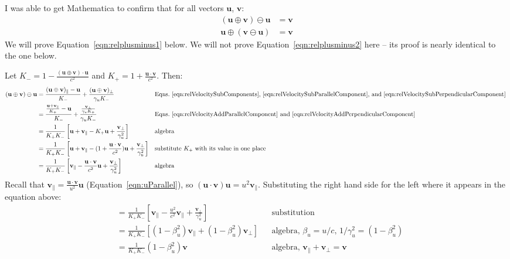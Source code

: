 \documentclass[a4paper]{article}
\theoremstyle{plain}
\theoremstyle{definition}
\newcommand{\vect}[1]{\mathbf{#1}}
\begin{document}
I was able to get Mathematica to confirm that
for all vectors $\vect{u}$, $\vect{v}$:
\begin{align}
(\vect{u} \oplus \vect{v}) \ominus \vect{u} & = \vect{v} \label{eqn:relplusminus1} \\
\vect{u} \oplus (\vect{v} \ominus \vect{u}) & = \vect{v} \label{eqn:relplusminus2}
\end{align}
We will prove Equation~\eqref{eqn:relplusminus1} below.
We will not prove Equation~\eqref{eqn:relplusminus2} here --
its proof is nearly identical to the one below.

Let $K_{-} = 1 - \frac{(\vect{u} \oplus \vect{v}) \cdot \vect{u}}{c^2}$
and $K_{+} = 1 + \frac{\vect{u} \cdot \vect{v}}{c^2}$.
Then:
\begin{align}
(\vect{u} \oplus \vect{v}) \ominus \vect{u}
  & = \frac{(\vect{u} \oplus \vect{v})_{\parallel} - \vect{u}}{K_{-}} + \frac{(\vect{u} \oplus \vect{v})_{\perp}}{\gamma_u K_{-}} & & \text{Eqns.~\eqref{eqn:relVelocitySubComponents},~\eqref{eqn:relVelocitySubParallelComponent}, and~\eqref{eqn:relVelocitySubPerpendicularComponent} } \nonumber \\
  & = \frac{\frac{\vect{u} + \vect{v}_{\parallel}}{K_{+}} - \vect{u}}{K_{-}} + \frac{\frac{\vect{v}_{\perp}}{\gamma_u K_{+}}}{\gamma_u K_{-}} & & \text{Eqns.~\eqref{eqn:relVelocityAddParallelComponent} and~\eqref{eqn:relVelocityAddPerpendicularComponent} } \nonumber \\
  & = \frac{1}{K_{+}K_{-}} \left[ \vect{u} + \vect{v}_{\parallel} - K_{+} \vect{u} + \frac{\vect{v}_{\perp}}{\gamma_u^2} \right] & & \text{algebra} \nonumber \\
  & = \frac{1}{K_{+}K_{-}} \left[ \vect{u} + \vect{v}_{\parallel} - (1 + \frac{\vect{u} \cdot \vect{v}}{c^2}) \vect{u} + \frac{\vect{v}_{\perp}}{\gamma_u^2} \right] & & \text{substitute $K_{+}$ with its value in one place} \nonumber \\
  & = \frac{1}{K_{+}K_{-}} \left[ \vect{v}_{\parallel} - \frac{\vect{u} \cdot \vect{v}}{c^2} \vect{u} + \frac{\vect{v}_{\perp}}{\gamma_u^2} \right] & & \text{algebra} \nonumber
\end{align}
Recall that
$\vect{v}_{\parallel} = \frac{\vect{u} \cdot \vect{v}}{u^2} \vect{u}$
(Equation~\eqref{eqn:uParallel}), so
$(\vect{u} \cdot \vect{v}) \vect{u} = u^2 \vect{v}_{\parallel}$.
Substituting the right hand side for the left where it appears
in the equation above:
\begin{align}
  & = \frac{1}{K_{+}K_{-}} \left[ \vect{v}_{\parallel} - \frac{u^2}{c^2} \vect{v}_{\parallel} + \frac{\vect{v}_{\perp}}{\gamma_u^2} \right] & & \text{substitution} \nonumber \\
  & = \frac{1}{K_{+}K_{-}} \left[ (1-\beta_u^2) \vect{v}_{\parallel} + (1-\beta_u^2)\vect{v}_{\perp} \right] & & \text{algebra, $\beta_u = u/c$, $1/\gamma_u^2 = (1-\beta_u^2)$} \nonumber \\
  & = \frac{1}{K_{+}K_{-}} (1-\beta_u^2) \vect{v} & & \text{algebra, $\vect{v}_{\parallel} + \vect{v}_{\perp} = \vect{v}$} \label{eqn:penultimateResult}
\end{align}
\end{document}
